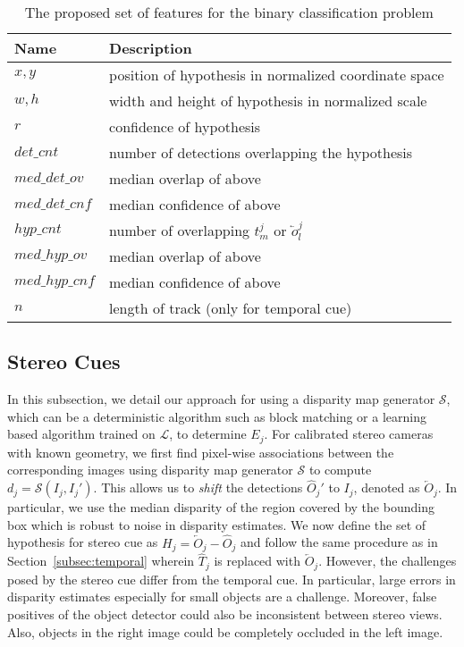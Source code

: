 \documentclass[letterpaper, 10 pt, journal, twoside]{IEEEtran}  %
\begin{document}
\begin{table}[ht]
\centering
\begin{tabular}{|m{6em}|m{6cm}|}
\hline
\textbf{Name} & \textbf{Description} \\
\hline
$x,y$ & position of hypothesis in normalized coordinate space \\
\hline
$w,h$ & width and height of hypothesis in normalized scale \\
\hline
$r$ & confidence of hypothesis \\
\hline
$det\_cnt$ & number of detections overlapping the hypothesis \\
\hline
$med\_det\_ov$ & median overlap of above \\
\hline
$med\_det\_cnf$ & median confidence of above \\
\hline
$hyp\_cnt$ & number of overlapping $t_m^j$ or $\overleftarrow{o}_l^j$ \\
\hline
$med\_hyp\_ov$ & median overlap of above \\
\hline
$med\_hyp\_cnf$ & median confidence of above \\
\hline
$n$ & length of track (only for temporal cue) \\
\hline
\end{tabular}
\caption{The proposed set of features for the binary classification problem}
\label{tbl:features}
\end{table}


\subsection{Stereo Cues}
\label{subsec:stereo}

In this subsection, we detail our approach for using a disparity map generator $\mathcal{S}$, which can be a deterministic algorithm such as block matching or a learning based algorithm \cite{zbontar2016stereo} trained on $\mathcal{L}$, to determine $E_j$. For calibrated stereo cameras with known geometry,
we first find pixel-wise associations between the corresponding images using disparity map generator $\mathcal{S}$ to compute $d_j = \mathcal{S}(I_j, I_j')$. 
This allows us to \emph{shift} the detections $\hat{O}_j'$ to $I_j$, denoted as $\overleftarrow{O}_j$. In particular, we use the median disparity of the region covered by the bounding box which is robust to noise in disparity estimates. We now define the set of hypothesis for stereo cue as $H_j = \overleftarrow{O}_j - \hat{O}_j$ and follow the same procedure as in Section~\ref{subsec:temporal} wherein $\hat{T}_j$ is replaced with $\overleftarrow{O}_j$. However, the challenges posed by the stereo cue differ from the temporal cue. In particular, large errors in disparity estimates especially for small objects are a challenge. Moreover, false positives of the object detector could also be inconsistent between stereo views. Also, objects in the right image could be completely occluded in the left image. 
\end{document}
